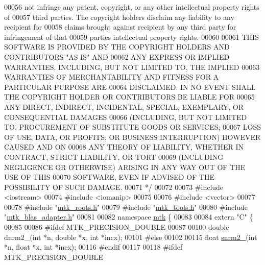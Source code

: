 \begin{DoxyCode}
00056 \textcolor{comment}{not infringe any patent, copyright, or any other intellectual property rights of}
00057 \textcolor{comment}{third parties. The copyright holders disclaim any liability to any recipient for}
00058 \textcolor{comment}{claims brought against recipient by any third party for infringement of that}
00059 \textcolor{comment}{parties intellectual property rights.}
00060 \textcolor{comment}{}
00061 \textcolor{comment}{THIS SOFTWARE IS PROVIDED BY THE COPYRIGHT HOLDERS AND CONTRIBUTORS "AS IS" AND}
00062 \textcolor{comment}{ANY EXPRESS OR IMPLIED WARRANTIES, INCLUDING, BUT NOT LIMITED TO, THE IMPLIED}
00063 \textcolor{comment}{WARRANTIES OF MERCHANTABILITY AND FITNESS FOR A PARTICULAR PURPOSE ARE}
00064 \textcolor{comment}{DISCLAIMED. IN NO EVENT SHALL THE COPYRIGHT HOLDER OR CONTRIBUTORS BE LIABLE FOR}
00065 \textcolor{comment}{ANY DIRECT, INDIRECT, INCIDENTAL, SPECIAL, EXEMPLARY, OR CONSEQUENTIAL DAMAGES}
00066 \textcolor{comment}{(INCLUDING, BUT NOT LIMITED TO, PROCUREMENT OF SUBSTITUTE GOODS OR SERVICES;}
00067 \textcolor{comment}{LOSS OF USE, DATA, OR PROFITS; OR BUSINESS INTERRUPTION) HOWEVER CAUSED AND ON}
00068 \textcolor{comment}{ANY THEORY OF LIABILITY, WHETHER IN CONTRACT, STRICT LIABILITY, OR TORT}
00069 \textcolor{comment}{(INCLUDING NEGLIGENCE OR OTHERWISE) ARISING IN ANY WAY OUT OF THE USE OF THIS}
00070 \textcolor{comment}{SOFTWARE, EVEN IF ADVISED OF THE POSSIBILITY OF SUCH DAMAGE.}
00071 \textcolor{comment}{*/}
00072 
00073 \textcolor{preprocessor}{#include <iostream>}
00074 \textcolor{preprocessor}{#include <iomanip>}
00075 
00076 \textcolor{preprocessor}{#include <vector>}
00077 
00078 \textcolor{preprocessor}{#include "\hyperlink{mtk__roots_8h}{mtk\_roots.h}"}
00079 \textcolor{preprocessor}{#include "\hyperlink{mtk__tools_8h}{mtk\_tools.h}"}
00080 \textcolor{preprocessor}{#include "\hyperlink{mtk__blas__adapter_8h}{mtk\_blas\_adapter.h}"}
00081 
00082 \textcolor{keyword}{namespace }\hyperlink{namespacemtk}{mtk} \{
00083 
00084 \textcolor{keyword}{extern} \textcolor{stringliteral}{"C"} \{
00085 
00086 \textcolor{preprocessor}{#ifdef MTK\_PRECISION\_DOUBLE}
00087 
00100 \textcolor{keywordtype}{double} dnrm2\_(\textcolor{keywordtype}{int} *n, \textcolor{keywordtype}{double} *x, \textcolor{keywordtype}{int} *incx);
00101 \textcolor{preprocessor}{#else}
00102 
00115 \textcolor{keywordtype}{float} \hyperlink{namespacemtk_a508e99fcb14d526bc43aa0a80aa4b658}{snrm2\_}(\textcolor{keywordtype}{int} *n, \textcolor{keywordtype}{float} *x, \textcolor{keywordtype}{int} *incx);
00116 \textcolor{preprocessor}{#endif}
00117 
00118 \textcolor{preprocessor}{#ifdef MTK\_PRECISION\_DOUBLE}

\end{DoxyCode}
